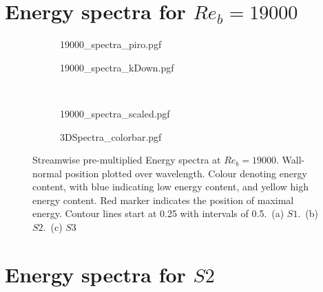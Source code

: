 \section{Energy spectra for $Re_b = 19000$}
\begin{figure}[h!]
    \centering
    \begin{subfigure}{0.495\textwidth}
        \subcaption{}
        {19000_spectra_piro.pgf}
        \label{subfig: 19000 spectra piro}
    \end{subfigure}
    \hfill
        \begin{subfigure}{0.495\textwidth}
            \subcaption{}
            {19000_spectra_kDown.pgf}
            \label{subfig: 19000 spectra kDown}
    \end{subfigure}
    \\[-20pt]
    \begin{subfigure}{0.495\textwidth}
        \subcaption{}
        {19000_spectra_scaled.pgf}
        \label{subfig: 19000 spectra scaled}
    \end{subfigure}
    \centering
    \begin{subfigure}{\textwidth}
        \centering
        \hspace{0.9cm}
        {3DSpectra_colorbar.pgf}
    \end{subfigure}
    \caption[Streamwise pre-multiplied energy spectra at $Re_b = 19000$]{Streamwise pre-multiplied Energy spectra at $Re_b = 19000$. Wall-normal position plotted over wavelength. Colour denoting energy content, with blue indicating low energy content, and yellow high energy content. Red marker indicates the position of maximal energy. Contour lines start at 0.25 with intervals of 0.5.~(a) $S1$.~(b) $S2$.~(c) $S3$}
    \label{fig: energy spectra 19000}
\end{figure}
\newpage
\section{Energy spectra for $S2$}

